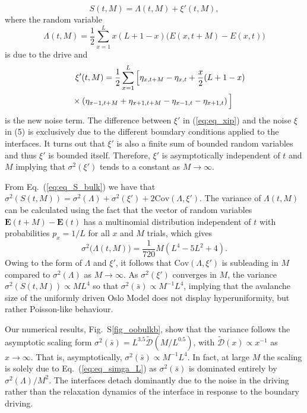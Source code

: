 \documentclass[doublecol]{epl2}
\newcommand{\elabel}[1]{\label{eq:#1}}
\newcommand{\eref}[1]{(\ref{eq:#1})}
\newcommand{\Eref}[1]{Eq.~(\ref{eq:#1})}
\newcommand{\bungledXR}[2]{#2}
\begin{document}
\begin{equation}
S(t,M) =\Lambda(t,M)+\xi'(t,M),
\elabel{eq_S_bulk}
\end{equation}
where the random variable
\begin{equation}
\Lambda(t,M) = \frac{1}{2} \sum_{x=1}^L x(L+1-x)\big(E({x,t+{M}})-E({x,t}) \big)
\elabel{eq_Lambda}
\end{equation}
is due to the drive and
\begin{eqnarray}
&&\hspace{-15pt}\xi'(t,M) = \frac{1}{2} \sum_{x=1}^L \Big[\eta_{x,t+{M}}-\eta_{x,t}+\frac{x}{2}(L+1-x) \Big.\nonumber\\
&&\Big.\times\left( \eta_{x-1,t+{M}}+ \eta_{x+1,t+{M}} - \eta_{x-1,t}-\eta_{x+1,t}\right)\Big]\hspace{15pt}\elabel{eq_xip}
\end{eqnarray}
is the new noise term. The difference between $\xi'$ in \eref{eq_xip} and the noise $\xi$ in \bungledXR{\Eref{eq_xi1}}{(5)} is exclusively due to the different boundary conditions applied to the interfaces. It turns out that $\xi'$ is also a finite sum of bounded random variables and thus $\xi'$ is bounded itself. Therefore, $\xi'$ is asymptotically independent of $t$ and $M$ implying that  $\sigma^2\left(\xi'\right)$ tends to a constant as $M\to\infty$.

From \Eref{eq_S_bulk} we have that $\sigma^2(S(t,M))=\sigma^2\left(\Lambda\right) +\sigma^2\left(\xi'\right) +2\text{Cov}(\Lambda,\xi')$. The variance of $\Lambda(t,M)$ can be calculated using the fact that the vector of random variables $\mathbf{E}(t+M)-\mathbf{E}(t)$ has a multinomial distribution independent of $t$ with probabilities $p_x=1/L$ for all $x$ and $M$ trials, which gives
\begin{equation}
\sigma^2\big(\Lambda(t,M)\big) =\frac{1}{720}M\left(L^4-5L^2+4\right).
\elabel{eq_simga_L}
\end{equation}
Owing to the form of $\Lambda$ and $\xi'$, it follows that $\text{Cov}(\Lambda,\xi')$ is subleading in $M$ compared to $\sigma^2(\Lambda)$ as $M\to\infty$.
As $\sigma^2(\xi')$ converges in $M$, the variance $\sigma^2(S(t,M))\propto
ML^4$ so that $\sigma^2(\bar{s})\propto M^{-1}L^4$, implying that the avalanche
size of the uniformly driven Oslo Model does not display hyperuniformity,
but rather Poisson-like behaviour.

Our numerical results, Fig.~S\ref{fig_oobulkb}, show that the variance follows the asymptotic scaling form
$\sigma^2(\bar{s}) = L^{3.5}\tilde{\mathcal{D}}\left({M}/{L^{0.5}}\right)$,
with $\tilde{\mathcal{D}}(x)\propto x^{-1}$ as $x\to\infty$. That is, asymptotically, $\sigma^2(\bar{s})\propto M^{-1}L^4$. In fact, at large $M$ the scaling is solely due to \Eref{eq_simga_L} as $\sigma^2(\bar{s})$ is dominated entirely by $\sigma^2(\Lambda)/M^2$. The interfaces detach dominantly due to the noise in the driving rather than the relaxation dynamics of the interface in response to the boundary driving.
\end{document}
